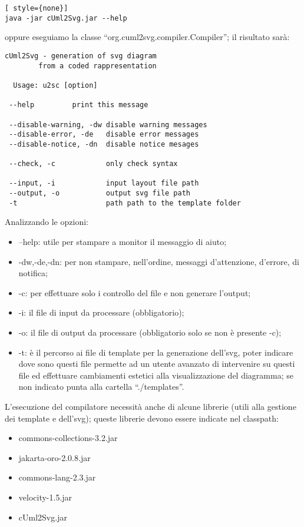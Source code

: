 \begin{lstlisting}[ style={none}]
java -jar cUml2Svg.jar --help
\end{lstlisting}

oppure eseguiamo la classe ``org.cuml2svg.compiler.Compiler''; il risultato sarà:

\begin{lstlisting}[caption={Output dell'help da linea di comando}, style={none}]
cUml2Svg - generation of svg diagram
        from a coded rappresentation

  Usage: u2sc [option]
 
 --help         print this message
 
 --disable-warning, -dw disable warning messages
 --disable-error, -de   disable error messages
 --disable-notice, -dn  disable notice mesages
 
 --check, -c            only check syntax
 
 --input, -i            input layout file path
 --output, -o           output svg file path
 -t                     path path to the template folder
\end{lstlisting}

Analizzando le opzioni:

\begin{itemize}
  \item --help: utile per stampare a monitor il messaggio di aiuto;
  \item -dw,-de,-dn: per non stampare, nell'ordine, messaggi d'attenzione,
  d'errore, di notifica;
  \item -c: per effettuare solo i controllo del file e non generare l'output;
  \item -i: il file di input da processare (obbligatorio);
  \item -o: il file di output da processare (obbligatorio solo se non è presente
  -c);
  \item -t: è il percorso ai file di template per la generazione dell'svg, poter
  indicare dove sono questi file permette ad un utente avanzato di intervenire
  su questi file ed effettuare cambiamenti estetici alla visualizzazione del
  diagramma; se non indicato punta alla cartella ``./templates''.
\end{itemize} 

L'esecuzione del compilatore necessità anche di alcune librerie (utili alla
gestione dei template e dell'svg); queste librerie devono essere indicate nel
classpath:

\begin{itemize}
  \item commons-collections-3.2.jar
  \item jakarta-oro-2.0.8.jar
  \item commons-lang-2.3.jar
  \item velocity-1.5.jar
  \item cUml2Svg.jar
\end{itemize}

